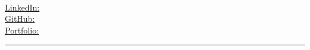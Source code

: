 \begin{center}
	\begin{minipage}[b]{.3\textwidth}
	\raggedright
	{\large \phone} \\ %
	{\city} \\ %
	\href{mailto:\email}{\email} %
	\end{minipage}%
	\begin{minipage}[b]{.36\textwidth}
	\makeatletter
	\centering {\HUGE \@author} \\
	\makeatother
    \vspace{.5em}
    {\color{highlight} \Large{\role}}
	\end{minipage}%
	\begin{minipage}[b]{.325\textwidth}
	\raggedleft 
	\href{https://www.linkedin.com/in/\LinkedIn}{LinkedIn: \LinkedIn} %
    \\[0.3em]
    \href{https://github.com/\GitHub}{GitHub: \GitHub} %
    \\[0.3em]
    \href{\PortfolioURL}{Portfolio: \Portfolio}
	\end{minipage}

{\color{highlight} \hrule}
\end{center}